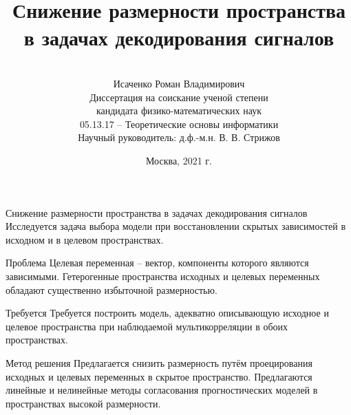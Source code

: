 \documentclass[10pt]{beamer}
\title[\hbox to 56mm{  \hfill\insertframenumber\,/\,\inserttotalframenumber}]
{\\ Снижение размерности пространства \\ в задачах декодирования сигналов}
\author[Роман Исаченко]{\\ 
	Исаченко Роман Владимирович \\
	\vspace{3mm}
	{\footnotesize 
	Диссертация на соискание ученой степени \\
	кандидата физико-математических наук
	} \\
	\vspace{0.2cm}
	{\footnotesize05.13.17 -- Теоретические основы информатики} \\
	\vspace{0.2cm}
	{\footnotesize Научный руководитель: д.ф.-м.н. В. В. Стрижов}
	}
\date{Москва, 2021 г.}
\begin{document}
\begin{frame}
\titlepage
\end{frame}
\begin{frame}{Снижение размерности пространства в задачах декодирования сигналов}
	Исследуется задача выбора модели при восстановлении скрытых зависимостей в исходном и в целевом пространствах.
	\begin{block}{Проблема}
		Целевая переменная -- вектор, компоненты которого являются зависимыми. 
		Гетерогенные пространства исходных и целевых переменных обладают существенно избыточной размерностью. 
	\end{block}
	
	\begin{block}{Требуется}
		Требуется построить модель, адекватно описывающую исходное и целевое пространства при наблюдаемой мультикорреляции в обоих пространствах.
	\end{block}
	
	\begin{block}{Метод решения}
		Предлагается снизить размерность путём проецирования исходных и целевых переменных в скрытое пространство. Предлагаются линейные и нелинейные методы согласования прогностических моделей в пространствах высокой размерности.	
	\end{block}
\end{frame}
\end{document}

